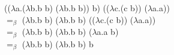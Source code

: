 \documentclass[12pt,a4paper,oneside]{article}
\begin{document}
    (($\lambda$a.($\lambda$b.b b) ($\lambda$b.b b)) b) (($\lambda$c.(c b)) ($\lambda$a.a))\\
    
    $=_{\beta}$ ($\lambda$b.b b) ($\lambda$b.b b) (($\lambda$c.(c b)) ($\lambda$a.a))\\
    
    $=_{\beta}$ ($\lambda$b.b b) ($\lambda$b.b b) ($\lambda$a.a b)\\
    
    $=_{\beta}$ ($\lambda$b.b b) ($\lambda$b.b b) b
    
\end{document}
